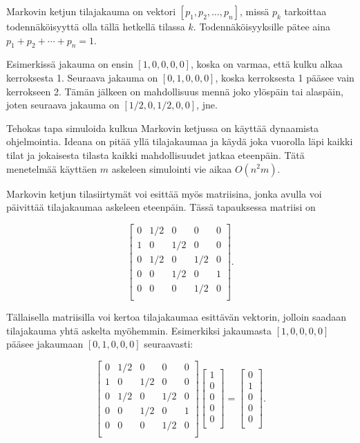 Markovin ketjun tilajakauma on vektori
$[p_1,p_2,\ldots,p_n]$, missä $p_k$ tarkoittaa
todennäköisyyttä olla tällä hetkellä tilassa $k$.
Todennäköisyyksille pätee aina $p_1+p_2+\cdots+p_n=1$.

Esimerkissä jakauma on ensin $[1,0,0,0,0]$,
koska on varmaa, että kulku alkaa kerroksesta 1.
Seuraava jakauma on $[0,1,0,0,0]$,
koska kerroksesta 1 pääsee vain kerrokseen 2.
Tämän jälkeen on mahdollisuus mennä joko ylöspäin
tai alaspäin, joten seuraava jakauma on $[1/2,0,1/2,0,0]$, jne.

Tehokas tapa simuloida kulkua Markovin ketjussa
on käyttää dynaamista ohjelmointia.
Ideana on pitää yllä tilajakaumaa
ja käydä joka vuorolla läpi kaikki tilat
ja jokaisesta tilasta kaikki mahdollisuudet jatkaa eteenpäin.
Tätä menetelmää käyttäen $m$ askeleen simulointi
vie aikaa $O(n^2 m)$.

Markovin ketjun tilasiirtymät voi esittää myös matriisina,
jonka avulla voi päivittää tilajakaumaa askeleen eteenpäin.
Tässä tapauksessa matriisi on

\[ 
 \begin{bmatrix}
  0 & 1/2 & 0 & 0 & 0 \\
  1 & 0 & 1/2 & 0 & 0 \\
  0 & 1/2 & 0 & 1/2 & 0 \\
  0 & 0 & 1/2 & 0 & 1 \\
  0 & 0 & 0 & 1/2 & 0 \\
 \end{bmatrix}.
\]

Tällaisella matriisilla voi kertoa tilajakaumaa esittävän
vektorin, jolloin saadaan tilajakauma yhtä askelta myöhemmin.
Esimerkiksi jakaumasta $[1,0,0,0,0]$ pääsee jakaumaan
$[0,1,0,0,0]$ seuraavasti:

\[ 
 \begin{bmatrix}
  0 & 1/2 & 0 & 0 & 0 \\
  1 & 0 & 1/2 & 0 & 0 \\
  0 & 1/2 & 0 & 1/2 & 0 \\
  0 & 0 & 1/2 & 0 & 1 \\
  0 & 0 & 0 & 1/2 & 0 \\
 \end{bmatrix}
 \begin{bmatrix}
  1 \\
  0 \\
  0 \\
  0 \\
  0 \\
 \end{bmatrix}
=
 \begin{bmatrix}
  0 \\
  1 \\
  0 \\
  0 \\
  0 \\
 \end{bmatrix}.
\]


